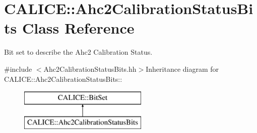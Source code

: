 \section{CALICE::Ahc2CalibrationStatusBits Class Reference}
\label{classCALICE_1_1Ahc2CalibrationStatusBits}


Bit set to describe the Ahc2 Calibration Status.  


{\ttfamily \#include $<$Ahc2CalibrationStatusBits.hh$>$}Inheritance diagram for CALICE::Ahc2CalibrationStatusBits::\begin{figure}[H]
\begin{center}
\leavevmode
\includegraphics[height=2cm]{classCALICE_1_1Ahc2CalibrationStatusBits}
\end{center}
\end{figure}
